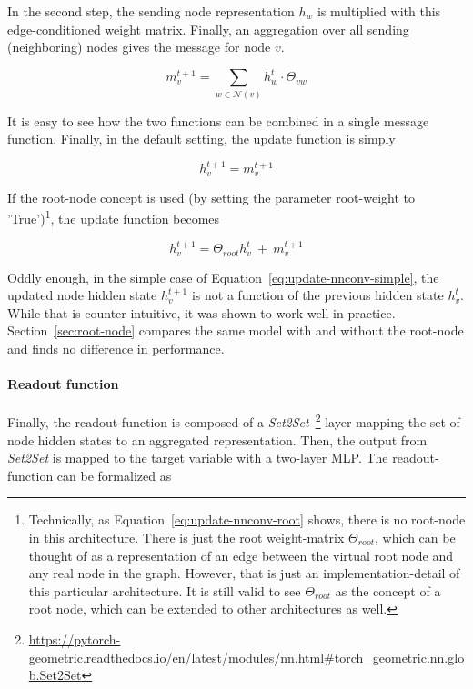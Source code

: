 In the second step, the sending node representation $h_w$ is multiplied with this edge-conditioned weight matrix. Finally, an aggregation over all sending (neighboring) nodes gives the message for node $v$.

\begin{equation}
 m_v^{t+1} = \sum_{w \in \mathcal{N}(v)} h_w^t \cdot \Theta_{vw}
\end{equation}

It is easy to see how the two functions can be combined in a single message function. Finally, in the default setting, the update function is simply

\begin{equation}\label{eq:update-nnconv-simple}
	h_v^{t+1} = m_v^{t+1}
\end{equation}

If the root-node concept is used (by setting the parameter root-weight to 'True')\footnote{
	Technically, as Equation~\ref{eq:update-nnconv-root} shows, there is no root-node in this architecture. There is just the root weight-matrix $\Theta_{root}$, which can be thought of as a representation of an edge between the virtual root node and any real node in the graph. However, that is just an implementation-detail of this particular architecture. It is still valid to see $\Theta_{root}$ as the concept of a root node, which can be extended to other architectures as well.
}, the update function becomes

\begin{equation}\label{eq:update-nnconv-root}
h_v^{t+1} = \Theta_{root}h_v^t~+~m_v^{t+1}
\end{equation}



Oddly enough, in the simple case of Equation~\ref{eq:update-nnconv-simple}, the updated node hidden state $h_v^{t+1}$ is not a function of the previous hidden state $h_v^t$. While that is counter-intuitive, it was shown to work well in practice. Section~\ref{sec:root-node} compares the same model with and without the root-node and finds no difference in performance.

\paragraph{Readout function} Finally, the readout function is composed of a \textit{Set2Set}~\footnote{\url{https://pytorch-geometric.readthedocs.io/en/latest/modules/nn.html\#torch_geometric.nn.glob.Set2Set}} layer mapping the set of node hidden states to an aggregated representation. Then, the output from \textit{Set2Set} is mapped to the target variable with a two-layer MLP. The readout-function can be formalized as

